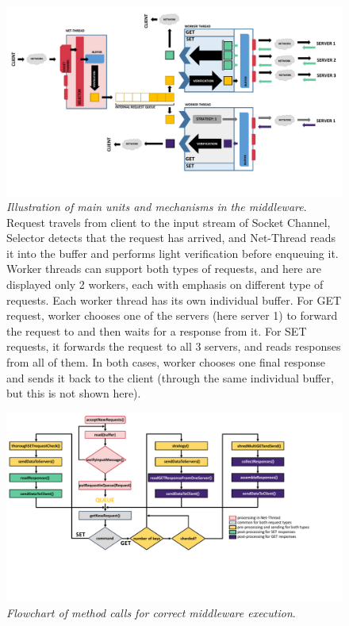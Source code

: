 \documentclass[11pt,a4paper]{article}
\begin{document}
\begin{figure}[htp]
	\begin{center}
		\includegraphics[width=1\linewidth]{../plots/illustration.pdf}
		\caption[illustration]{\textit{Illustration of main units and mechanisms in the middleware}. Request travels from client to the input stream of Socket Channel, Selector detects that the request has arrived, and Net-Thread reads it into the buffer and performs light verification before enqueuing it. Worker threads can support both types of requests, and here are displayed only 2 workers, each with emphasis on different type of requests. Each worker thread has its own individual buffer. For GET request, worker chooses one of the servers (here server 1) to forward the request to and then waits for a response from it. For SET requests, it forwards the request to all 3 servers, and reads responses from all of them. In both cases, worker chooses one final response and sends it back to the client (through the same individual buffer, but this is not shown here).  }
		\label{Figure:illustration}
	\end{center}
\end{figure}

\begin{figure}[htp]
	\begin{center}
		\includegraphics[width=1\linewidth]{../plots/flowchart.pdf}
		\caption[illustration]{\textit{Flowchart of method calls for correct middleware execution}.  }
		\label{Figure:flowchart}
	\end{center}
\end{figure}
\end{document}
